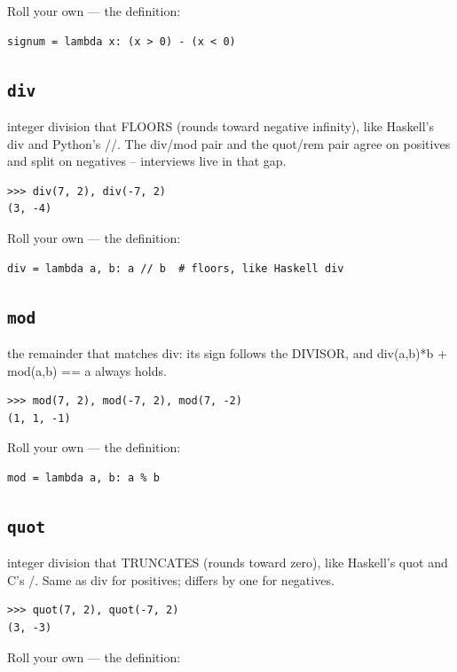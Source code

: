\documentclass[10pt,letterpaper]{book}
\begin{document}
Roll your own --- the definition:

\begin{lstlisting}[style=ex]
signum = lambda x: (x > 0) - (x < 0)
\end{lstlisting}

\subsection{\texttt{div}}\label{def:div}
integer division that FLOORS (rounds toward negative infinity), like Haskell's div and Python's //. The div/mod pair and the quot/rem pair agree on positives and split on negatives -- interviews live in that gap.
\begin{lstlisting}[style=ex]
>>> div(7, 2), div(-7, 2)
(3, -4)
\end{lstlisting}

Roll your own --- the definition:

\begin{lstlisting}[style=ex]
div = lambda a, b: a // b  # floors, like Haskell div
\end{lstlisting}
\subsection{\texttt{mod}}\label{def:mod}
the remainder that matches div: its sign follows the DIVISOR, and div(a,b)*b + mod(a,b) == a always holds.
\begin{lstlisting}[style=ex]
>>> mod(7, 2), mod(-7, 2), mod(7, -2)
(1, 1, -1)
\end{lstlisting}

Roll your own --- the definition:

\begin{lstlisting}[style=ex]
mod = lambda a, b: a % b
\end{lstlisting}
\subsection{\texttt{quot}}\label{def:quot}
integer division that TRUNCATES (rounds toward zero), like Haskell's quot and C's /. Same as div for positives; differs by one for negatives.
\begin{lstlisting}[style=ex]
>>> quot(7, 2), quot(-7, 2)
(3, -3)
\end{lstlisting}

Roll your own --- the definition:
\end{document}

